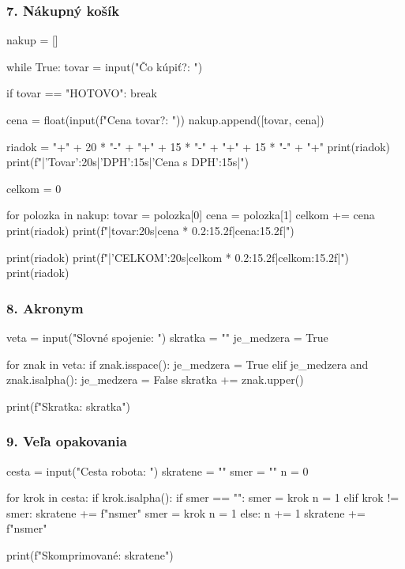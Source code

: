 \subsubsection*{7. Nákupný košík}
\begin{solution}
nakup = []

while True:
    tovar = input("Čo kúpiť?: ")

    if tovar == "HOTOVO":
        break

    cena = float(input(f"Cena {tovar}?: "))
    nakup.append([tovar, cena])

riadok = "+" + 20 * "-" + "+" + 15 * "-" + "+" + 15 * "-" + "+"
print(riadok)
print(f"|{'Tovar':20s}|{'DPH':15s}|{'Cena s DPH':15s}|")

celkom = 0

for polozka in nakup:
    tovar = polozka[0]
    cena = polozka[1]
    celkom += cena
    print(riadok)
    print(f"|{tovar:20s}|{cena * 0.2:15.2f}|{cena:15.2f}|")


print(riadok)
print(f"|{'CELKOM':20s}|{celkom * 0.2:15.2f}|{celkom:15.2f}|")
print(riadok)
\end{solution}


\subsubsection*{8. Akronym}
\begin{solution}
veta = input("Slovné spojenie: ")
skratka = ""
je_medzera = True

for znak in veta:
    if znak.isspace():
        je_medzera = True
    elif je_medzera and znak.isalpha():
       je_medzera = False
       skratka += znak.upper()

print(f"Skratka: {skratka}")
\end{solution}


\subsubsection*{9. Veľa opakovania}
\begin{solution}
cesta = input("Cesta robota: ")
skratene = ""
smer = ""
n = 0

for krok in cesta:
    if krok.isalpha():
        if smer == "":
            smer = krok
            n = 1
        elif krok != smer:
            skratene += f"{n}{smer}"
            smer = krok
            n = 1
        else:
            n += 1
skratene += f"{n}{smer}"

print(f"Skomprimované: {skratene}")
\end{solution}
